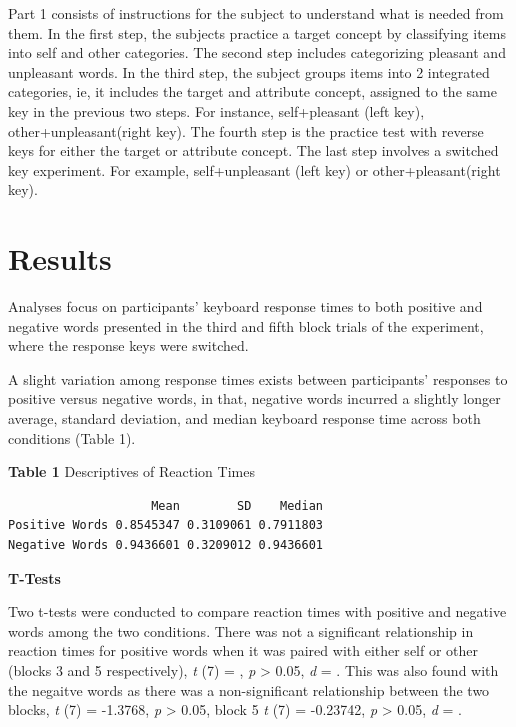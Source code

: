 \documentclass[11pt]{article}
\begin{document}
Part 1 consists of instructions for the subject to understand what is needed from them. In the first step, the subjects practice a target concept by classifying items into self and other categories. The second step includes categorizing pleasant and unpleasant words. In the third step, the subject groups items into 2 integrated categories, ie, it includes the target and attribute concept, assigned to the same key in the previous two steps. For instance, self+pleasant (left key), other+unpleasant(right key). The fourth step is the practice test with reverse keys for either the target or attribute concept. The last step involves a switched key experiment. For example, self+unpleasant (left key) or other+pleasant(right key). 

\section{Results}
\label{sec:orgb7e5296}


Analyses focus on participants' keyboard response times to both positive and negative words presented in the third and fifth block trials of the experiment, where the response keys were switched.


A slight variation among response times exists between participants’ responses to positive versus negative words, in that, negative words incurred a slightly longer average, standard deviation, and median keyboard response time across both conditions (Table 1). 

\noindent
\textbf{Table 1}
Descriptives of Reaction Times 

\begin{verbatim}
                    Mean        SD    Median
Positive Words 0.8545347 0.3109061 0.7911803
Negative Words 0.9436601 0.3209012 0.9436601
\end{verbatim}

\noindent
\textbf{T-Tests}

Two t-tests were conducted to compare reaction times with positive and negative words among the two conditions. There was not a significant relationship in reaction times for positive words when it was paired with either self or other (blocks 3 and 5 respectively), \emph{t} (7) =  , \emph{p} > 0.05, \emph{d} = . This  was also found with the negaitve words as there was a  non-significant relationship between the two blocks, \emph{t} (7) = -1.3768, \emph{p} > 0.05, block 5 \emph{t} (7) = -0.23742, \emph{p} > 0.05, \emph{d} = .   

\newpage
\end{document}

